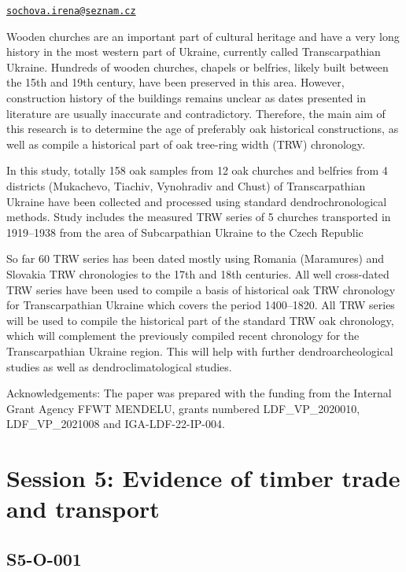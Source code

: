 \documentclass[
]{book}
\begin{document}
\href{mailto:sochova.irena@seznam.cz}{\nolinkurl{sochova.irena@seznam.cz}}

Wooden churches are an important part of cultural heritage and have a very long history in the most western part of Ukraine, currently called Transcarpathian Ukraine. Hundreds of wooden churches, chapels or belfries, likely built between the 15th and 19th century, have been preserved in this area. However, construction history of the buildings remains unclear as dates presented in literature are usually inaccurate and contradictory. Therefore, the main aim of this research is to determine the age of preferably oak historical constructions, as well as compile a historical part of oak tree-ring width (TRW) chronology.

In this study, totally 158 oak samples from 12 oak churches and belfries from 4 districts (Mukachevo, Tiachiv, Vynohradiv and Chust) of Transcarpathian Ukraine have been collected and processed using standard dendrochronological methods. Study includes the measured TRW series of 5 churches transported in 1919--1938 from the area of Subcarpathian Ukraine to the Czech Republic

So far 60 TRW series has been dated mostly using Romania (Maramures) and Slovakia TRW chronologies to the 17th and 18th centuries. All well cross-dated TRW series have been used to compile a basis of historical oak TRW chronology for Transcarpathian Ukraine which covers the period 1400--1820. All TRW series will be used to compile the historical part of the standard TRW oak chronology, which will complement the previously compiled recent chronology for the Transcarpathian Ukraine region. This will help with further dendroarcheological studies as well as dendroclimatological studies.

Acknowledgements: The paper was prepared with the funding from the Internal Grant Agency FFWT MENDELU, grants numbered LDF\_VP\_2020010, LDF\_VP\_2021008 and IGA-LDF-22-IP-004.

\hypertarget{session-5-evidence-of-timber-trade-and-transport}{%
\chapter*{Session 5: Evidence of timber trade and transport}\label{session-5-evidence-of-timber-trade-and-transport}}

\hypertarget{s5-o-001}{%
\section*{S5-O-001}\label{s5-o-001}}
\end{document}
